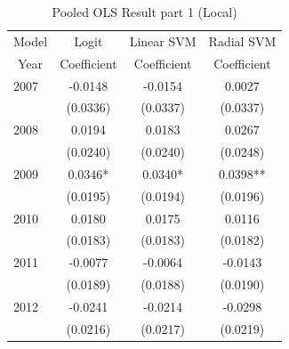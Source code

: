 \documentclass[11pt,a4paper,oneside]{article}
\begin{document}
\begin{table}[!t]
	\centering
	\caption{Pooled OLS Result part 1 (Local)}
	\begin{threeparttable}
	\def\arraystretch{0.7}
	\begin{tabular}{*7c}
		\toprule 
		{Model }  & \multicolumn{2}{c}{Logit} & \multicolumn{2}{c}{Linear SVM} & \multicolumn{2}{c}{Radial SVM}\\
		{Year} & \multicolumn{2}{c}{Coefficient} & \multicolumn{2}{c}{Coefficient} & \multicolumn{2}{c}{Coefficient}\\
		\midrule
		\multicolumn{1}{l}{2007} & \multicolumn{2}{c}{-0.0148} & \multicolumn{2}{c}{-0.0154} & \multicolumn{2}{c}{0.0027}\\
		\multicolumn{1}{l}{} & \multicolumn{2}{c}{(0.0336)} & \multicolumn{2}{c}{(0.0337)} & \multicolumn{2}{c}{(0.0337)}\\
		
		\multicolumn{1}{l}{2008} & \multicolumn{2}{c}{0.0194} & \multicolumn{2}{c}{0.0183} & \multicolumn{2}{c}{0.0267}\\
		\multicolumn{1}{l}{} & \multicolumn{2}{c}{(0.0240)} & \multicolumn{2}{c}{(0.0240)} & \multicolumn{2}{c}{(0.0248)}\\
		
		\multicolumn{1}{l}{2009} & \multicolumn{2}{c}{0.0346*} & \multicolumn{2}{c}{0.0340*} & \multicolumn{2}{c}{0.0398**}\\
		\multicolumn{1}{l}{} & \multicolumn{2}{c}{(0.0195)} & \multicolumn{2}{c}{(0.0194)} & \multicolumn{2}{c}{(0.0196)}\\
		
		\multicolumn{1}{l}{2010} & \multicolumn{2}{c}{0.0180} & \multicolumn{2}{c}{0.0175} & \multicolumn{2}{c}{0.0116}\\
		\multicolumn{1}{l}{} & \multicolumn{2}{c}{(0.0183)} & \multicolumn{2}{c}{(0.0183)} & \multicolumn{2}{c}{(0.0182)}\\
		
		\multicolumn{1}{l}{2011} & \multicolumn{2}{c}{-0.0077} & \multicolumn{2}{c}{-0.0064} & \multicolumn{2}{c}{-0.0143}\\
		\multicolumn{1}{l}{} & \multicolumn{2}{c}{(0.0189)} & \multicolumn{2}{c}{(0.0188)} & \multicolumn{2}{c}{(0.0190)}\\
		
		\multicolumn{1}{l}{2012} & \multicolumn{2}{c}{-0.0241} & \multicolumn{2}{c}{-0.0214} & \multicolumn{2}{c}{-0.0298}\\
		\multicolumn{1}{l}{} & \multicolumn{2}{c}{(0.0216)} & \multicolumn{2}{c}{(0.0217)} & \multicolumn{2}{c}{(0.0219)}\\
		

\end{tabular}
\end{threeparttable}
\end{table}
\end{document}
